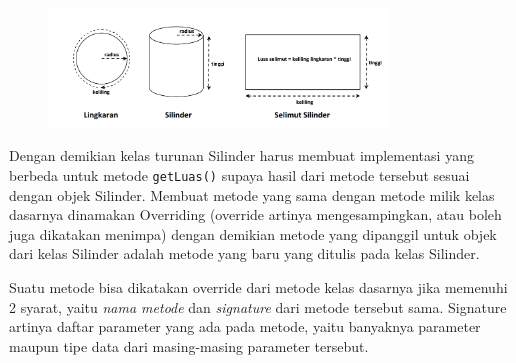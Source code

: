 \begin{figure}[htbp]
\centering
\includegraphics[width=0.8\textwidth]{images/capture7-4.png}
\caption{}
\end{figure}

Dengan demikian kelas turunan Silinder harus membuat implementasi yang
berbeda untuk metode \texttt{getLuas()} supaya hasil dari metode
tersebut sesuai dengan objek Silinder. Membuat metode yang sama dengan
metode milik kelas dasarnya dinamakan Overriding (override artinya
mengesampingkan, atau boleh juga dikatakan menimpa) dengan demikian
metode yang dipanggil untuk objek dari kelas Silinder adalah metode yang
baru yang ditulis pada kelas Silinder.

Suatu metode bisa dikatakan override dari metode kelas dasarnya jika
memenuhi 2 syarat, yaitu \emph{nama metode} dan \emph{signature} dari
metode tersebut sama. Signature artinya daftar parameter yang ada pada
metode, yaitu banyaknya parameter maupun tipe data dari masing-masing
parameter tersebut.

